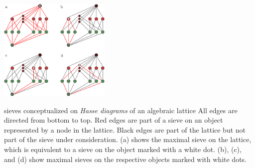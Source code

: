 \begin{frame}
\centering\includegraphics[width=0.4\textwidth]{fig/sieveHasseNoNum.pdf}
\begin{block}{sieves conceptualized on {\it Hasse diagrams} of an algebraic lattice}
All edges are directed from bottom to top. Red edges are part of a sieve on an object represented by a node in the lattice. Black edges are part of the lattice but not part of the sieve under consideration. (a) shows the maximal sieve on the lattice, which is equivalent to a sieve on the object marked with a white dot. (b), (c), and (d) show maximal sieves on the respective objects marked with white dots.
\end{block}
\end{frame}